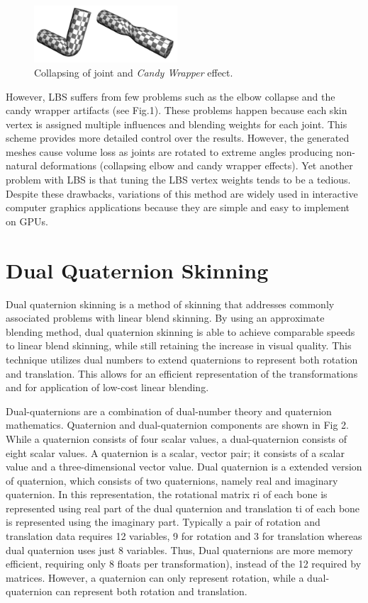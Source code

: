 \documentclass[annual]{styles/acmsiggraph}
\begin{document}
\begin{figure}[ht]
  \centering
  \includegraphics[width=2.1in]{images/candy}
  \caption{Collapsing of joint and \textit{Candy Wrapper} effect.}
  \label{bw}
\end{figure}

However, LBS suffers from few problems such as the elbow collapse and the candy wrapper artifacts (see Fig.1). These problems happen because each skin vertex is assigned multiple inﬂuences and blending weights for each joint. This scheme provides more detailed control over the results. However, the generated meshes cause volume loss as joints are rotated to extreme angles producing non-natural deformations (collapsing elbow and candy wrapper effects). Yet another problem with LBS is that tuning the LBS vertex weights tends to be a tedious. Despite these drawbacks, variations of this method are widely used in interactive computer graphics applications because they are simple and easy to implement on GPUs.

\section{Dual Quaternion Skinning}
Dual quaternion skinning is a method of skinning that addresses commonly associated problems with linear blend skinning. By using an approximate blending method, dual quaternion skinning is able to achieve comparable speeds to linear blend skinning, while still retaining the increase in visual quality. This technique utilizes dual numbers to extend quaternions to represent both rotation and translation. This allows for an efficient representation of the transformations and for application of low-cost linear blending.

Dual-quaternions are a combination of dual-number theory and quaternion mathematics. Quaternion and dual-quaternion components are shown in Fig 2. While a quaternion consists of four scalar values, a dual-quaternion consists of eight scalar values. A quaternion is a scalar, vector pair; it consists of a scalar value and a three-dimensional vector value. Dual quaternion is a extended version of quaternion, which consists of two quaternions, namely real and imaginary quaternion. In this representation, the rotational matrix ri of each bone is represented using real part of the dual quaternion and translation ti of each bone is represented using the imaginary part. Typically a pair of rotation and translation data requires 12 variables, 9 for rotation and 3 for translation whereas dual quaternion uses just 8 variables. Thus, Dual quaternions are more memory efficient, requiring only 8 floats per transformation), instead of the 12 required by matrices. However, a quaternion can only represent rotation, while a dual-quaternion can represent both rotation and translation.
\end{document}
